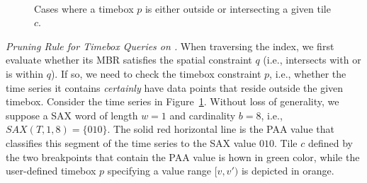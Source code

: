 \begin{figure}[!tb]
 \centering
 \
\caption{Cases where a timebox $p$ is either outside or intersecting a given tile $c$.}
\label{fig:br_outside}
\end{figure}

\emph{Pruning Rule for Timebox Queries on \hisax.}
When traversing the \hisax index, we first evaluate whether its MBR satisfies the spatial constraint $q$ (i.e., intersects with or is within $q$). If so, we need to check the timebox constraint $p$, i.e., whether the time series it contains {\em certainly} have data points that reside outside the given timebox. Consider the time series in Figure~\ref{fig:br_outside}. Without loss of generality, we suppose a SAX word of length $w=1$ and cardinality $b=8$, i.e., $SAX(T,1,8)=\{010\}$. The solid red horizontal line is the PAA value that classifies this segment of the time series to the SAX value $010$. Tile $c$ defined by the two breakpoints that contain the PAA value is hown in green color, while the user-defined timebox $p$ specifying a value range $[v,v')$ is depicted in orange.

